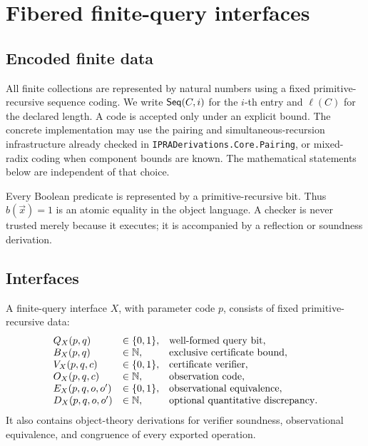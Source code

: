 \section{Fibered finite-query interfaces}
\label{sec:interfaces}

\subsection{Encoded finite data}

All finite collections are represented by natural numbers using a fixed
primitive-recursive sequence coding.  We write
\(\mathsf{Seq}(C,i)\) for the \(i\)-th entry and \(\ell(C)\) for the declared length.
A code is accepted only under an explicit bound.  The concrete implementation
may use the pairing and simultaneous-recursion infrastructure already checked
in \texttt{IPRADerivations.Core.Pairing}, or mixed-radix coding when component
bounds are known.  The mathematical statements below are independent of that
choice.

Every Boolean predicate is represented by a primitive-recursive bit.  Thus
\(b(\vec x)=1\) is an atomic equality in the object language.  A checker is
never trusted merely because it executes; it is accompanied by a reflection
or soundness derivation.

\subsection{Interfaces}

\begin{definition}
A finite-query interface \(X\), with parameter code \(p\), consists of fixed
primitive-recursive data:
\[
\begin{array}{lll}
Q_X(p,q) &\in \{0,1\}, &\text{well-formed query bit},\\
B_X(p,q) &\in \mathbb N, &\text{exclusive certificate bound},\\
V_X(p,q,c) &\in \{0,1\}, &\text{certificate verifier},\\
O_X(p,q,c) &\in \mathbb N, &\text{observation code},\\
E_X(p,q,o,o') &\in \{0,1\}, &\text{observational equivalence},\\
D_X(p,q,o,o') &\in \mathbb N, &\text{optional quantitative discrepancy}.
\end{array}
\]
It also contains object-theory derivations for verifier soundness,
observational equivalence, and congruence of every exported operation.
\end{definition}

